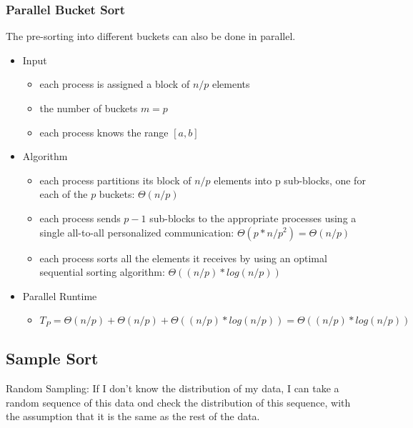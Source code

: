 \clearpage
\hypertarget{parallel-bucket-sort}{%
\subsubsection{Parallel Bucket Sort}\label{parallel-bucket-sort}}

The pre-sorting into different buckets can also be done in parallel.

\begin{itemize}
\tightlist
\item
  Input

  \begin{itemize}
  \tightlist
  \item
    each process is assigned a block of $n/p$ elements
  \item
    the number of buckets $m = p$
  \item
    each process knows the range $[a, b]$
  \end{itemize}
\item
  Algorithm

  \begin{itemize}
  \tightlist
  \item
    each process partitions its block of $n/p$ elements into p sub-blocks, one for each of the $p$ buckets: $\Theta(n/p)$
  \item
    each process sends $p- 1$ sub-blocks to the appropriate processes
    using a single all-to-all personalized communication: $\Theta(p * n/p^2) = \Theta(n/p)$
  \item
    each process sorts all the elements it receives by using an optimal
    sequential sorting algorithm: $\Theta((n/p) * log (n/p))$
  \end{itemize}
\item
  Parallel Runtime

  \begin{itemize}
  \tightlist
  \item
    $T_P = \Theta(n/p) + \Theta(n/p) + \Theta((n/p) *log (n/p)) = \Theta((n/p) * log (n/p))$
  \end{itemize}
\end{itemize}


\clearpage
\hypertarget{sample-sort}{%
\subsection{Sample Sort}\label{sample-sort}}

\begin{tcolorbox}[colback=red!5!white,colframe=red!75!black]
Random Sampling: If I don't know the distribution of my data, I can take a random sequence of this data ond check the distribution of this sequence, with the assumption that it is the same as the rest of the data. 
\end{tcolorbox}

